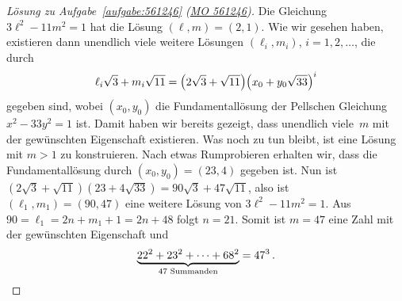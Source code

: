 \begin{proof}[Lösung zu Aufgabe~\ref{aufgabe:561246} \textmd{(\href{https://www.mathematik-olympiaden.de/moev/index.php?option=com_download&thema=a&datei=A56124b.pdf&format=raw}{MO 561246})}]
	Die Gleichung $3\ell^2-11m^2=1$ hat die Lösung $(\ell,m)=(2,1)$. Wie wir gesehen haben, existieren dann unendlich viele weitere Lösungen $(\ell_i,m_i)$, $i=1,2,\dotsc$, die durch
	\begin{equation*}
		\ell_i\sqrt{3}+m_i\sqrt{11}=\parens*{2\sqrt{3}+\sqrt{11}}\parens*{x_0+y_0\sqrt{33}}^i
	\end{equation*}
	gegeben sind, wobei $(x_0,y_0)$ die Fundamentallösung der Pellschen Gleichung $x^2-33y^2=1$ ist. Damit haben wir bereits gezeigt, dass unendlich viele~$m$ mit der gewünschten Eigenschaft existieren. Was noch zu tun bleibt, ist eine Lösung mit $m>1$ zu konstruieren. Nach etwas Rumprobieren erhalten wir, dass die Fundamentallösung durch $(x_0,y_0)=(23,4)$ gegeben ist. Nun ist $(2\sqrt{3}+\sqrt{11})(23+4\sqrt{33})=90\sqrt{3}+47\sqrt{11}$, also ist $(\ell_1,m_1)=(90,47)$ eine weitere Lösung von $3\ell^2-11m^2=1$. Aus $90=\ell_1=2n+m_1+1=2n+48$ folgt $n=21$. Somit ist $m=47$ eine Zahl mit der gewünschten Eigenschaft und
	\begin{equation*}
		\underbrace{22^2+23^2+\dotsb+68^2}_{\text{$47$ Summanden}}=47^3\,.\qedhere
	\end{equation*}
\end{proof}

